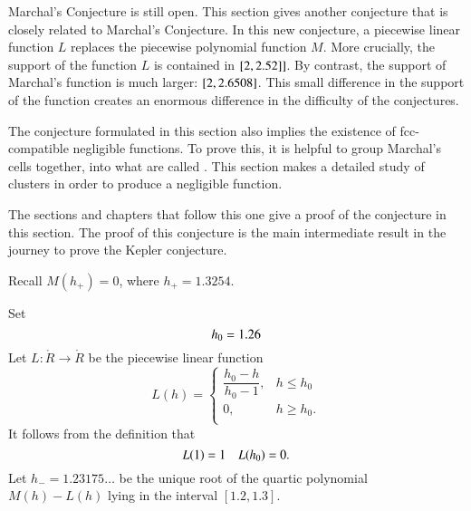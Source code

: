 \begin{summary}  Marchal's Conjecture is still open.  This section gives another conjecture that is closely related to Marchal's Conjecture.  In this new conjecture, a piecewise linear function $L$ replaces the piecewise polynomial function $M$.   More crucially, the support of the function $L$ is contained in $[2,2.52]]$.  By contrast, the support of Marchal's function is much larger: $[2,2.6508]$.
This small difference in the support of the function creates an enormous difference in the difficulty of the conjectures.    

The conjecture formulated in this section also implies the existence of fcc-compatible negligible functions.  To prove this, it is helpful to group Marchal's cells together, into what are called .  This section makes a detailed study of clusters in order to produce a negligible function.  

 The sections and chapters that follow this one give a proof of the conjecture in this section.  The  proof of this conjecture is the main intermediate result in the journey to prove the Kepler conjecture.
\end{summary}

Recall $M(h_+) = 0$, where   $h_+ = 1.3254$.
%

\begin{definition}[$L$,~$h_0$,~$h_-$]\label{def:L}
Set
\begin{displaymath}
  h_0 = 1.26\\  %
\end{displaymath}
Let $L:\ring{R}\to\ring{R}$ be the piecewise linear function 
\begin{displaymath}
L(h) = \begin{cases}
\dfrac{h_0-h}{h_0-1}, & h \le h_0 \\
0, & h\ge h_0. \\
\end{cases}
\end{displaymath}
It follows from the definition that
\begin{displaymath}
L(1) = 1\quad L({h_0}) = 0.
\end{displaymath}
Let $h_- = 1.23175\ldots$ be the unique root of the quartic polynomial
$M(h)-L(h)$ lying in the interval $[1.2,1.3]$.
%
%
%
\end{definition}

